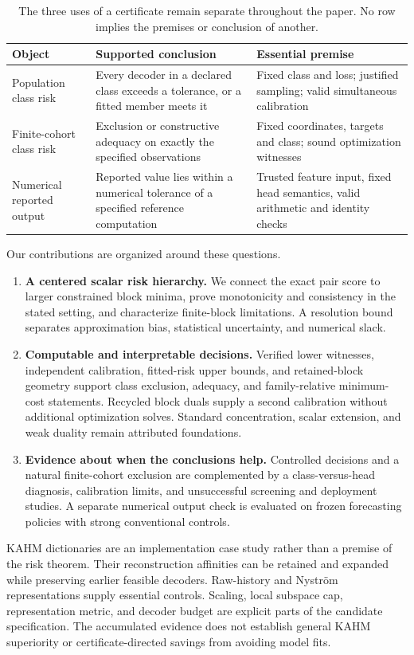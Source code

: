 \begin{table}[t]
\centering\small
\begin{tabular}{@{}p{.21\linewidth}p{.36\linewidth}p{.37\linewidth}@{}}
\toprule
Object & Supported conclusion & Essential premise\\
\midrule
Population class risk & Every decoder in a declared class exceeds a tolerance, or a fitted member meets it & Fixed class and loss; justified sampling; valid simultaneous calibration\\
Finite-cohort class risk & Exclusion or constructive adequacy on exactly the specified observations & Fixed coordinates, targets and class; sound optimization witnesses\\
Numerical reported output & Reported value lies within a numerical tolerance of a specified reference computation & Trusted feature input, fixed head semantics, valid arithmetic and identity checks\\
\bottomrule
\end{tabular}
\caption{The three uses of a certificate remain separate throughout the paper. No row implies the premises or conclusion of another.}
\label{tab:assurance}
\end{table}

Our contributions are organized around these questions.
\begin{enumerate}[leftmargin=*,itemsep=2pt]
\item \textbf{A centered scalar risk hierarchy.} We connect the exact pair score to larger constrained block minima, prove monotonicity and consistency in the stated setting, and characterize finite-block limitations. A resolution bound separates approximation bias, statistical uncertainty, and numerical slack.
\item \textbf{Computable and interpretable decisions.} Verified lower witnesses, independent calibration, fitted-risk upper bounds, and retained-block geometry support class exclusion, adequacy, and family-relative minimum-cost statements. Recycled block duals supply a second calibration without additional optimization solves. Standard concentration, scalar extension, and weak duality remain attributed foundations.
\item \textbf{Evidence about when the conclusions help.} Controlled decisions and a natural finite-cohort exclusion are complemented by a class-versus-head diagnosis, calibration limits, and unsuccessful screening and deployment studies. A separate numerical output check is evaluated on frozen forecasting policies with strong conventional controls.
\end{enumerate}

KAHM dictionaries are an implementation case study rather than a premise of the risk theorem. Their reconstruction affinities can be retained and expanded while preserving earlier feasible decoders. Raw-history and Nystr\"om representations supply essential controls. Scaling, local subspace cap, representation metric, and decoder budget are explicit parts of the candidate specification. The accumulated evidence does not establish general KAHM superiority or certificate-directed savings from avoiding model fits.

